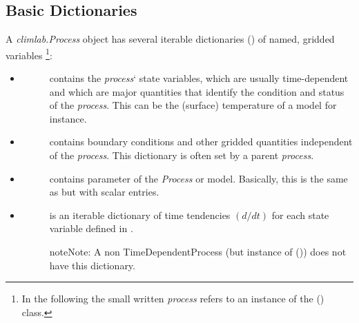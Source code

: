 \documentclass[a4paper,10pt,english]{sphinxmanual}
\begin{document}
\subsection{Basic Dictionaries}
\label{architecture:basic-dictionaries}
A \emph{climlab.Process} object has several iterable dictionaries (\href{http://docs.python.org/2.7/library/stdtypes.html\#dict}{}) of named, gridded variables \footnote[1]{
In the following the small written \emph{process} refers to an instance of the {\hyperref[api/climlab.process:climlab.process.process.Process]{\emph{}}} () class.
}:
\begin{itemize}
\item {} \begin{description}
\item[{}] \leavevmode
contains the \emph{process}` state variables, which are usually time-dependent and which are major quantities that identify the condition and status of the \emph{process}. This can be the (surface) temperature of a model for instance.

\end{description}

\item {} \begin{description}
\item[{}] \leavevmode
contains boundary conditions and other gridded quantities independent of the \emph{process}. This dictionary is often set by a parent \emph{process}.

\end{description}

\item {} \begin{description}
\item[{}] \leavevmode
contains parameter of the \emph{Process} or model. Basically, this is the same as  but with scalar entries.

\end{description}

\item {} \begin{description}
\item[{}] \leavevmode
is an iterable dictionary of time tendencies \((d/dt)\) for each state variable defined in .

\begin{notice}{note}{Note:}
A non TimeDependentProcess (but instance of {\hyperref[api/climlab.process:climlab.process.process.Process]{\emph{}}} ()) does not have this dictionary.
\end{notice}


\end{description}
\end{itemize}
\end{document}
